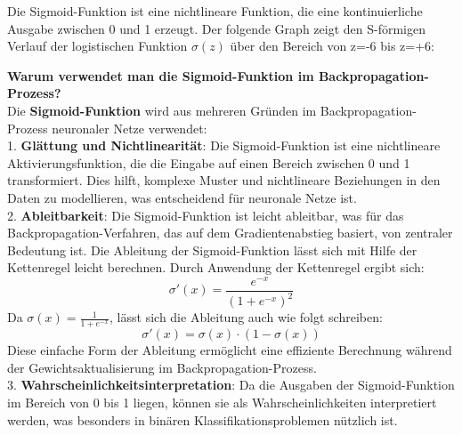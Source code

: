\documentclass[12pt]{article}
\begin{document}
Die Sigmoid-Funktion ist eine nichtlineare Funktion, die eine kontinuierliche Ausgabe zwischen 0 und 1 erzeugt. Der folgende Graph zeigt den S-förmigen Verlauf der logistischen Funktion  $\sigma(z)$ über den Bereich von z=-6 bis z=+6:\\
\begin{center}
\end{center}
%
\textbf{Warum verwendet man die Sigmoid-Funktion im Backpropagation-Prozess?}\\[0.2cm]
%
Die \textbf{Sigmoid-Funktion} wird aus mehreren Gründen im Backpropagation-Prozess neuronaler Netze verwendet:\\[0.2cm]
1. \textbf{Glättung und Nichtlinearität}: Die Sigmoid-Funktion ist eine nichtlineare Aktivierungsfunktion, die die Eingabe auf einen Bereich zwischen 0 und 1 transformiert. Dies hilft, komplexe Muster und nichtlineare Beziehungen in den Daten zu modellieren, was entscheidend für neuronale Netze ist.\\[0.2cm]
2. \textbf{Ableitbarkeit}: Die Sigmoid-Funktion ist leicht ableitbar, was für das Backpropagation-Verfahren, das auf dem Gradientenabstieg basiert, von zentraler Bedeutung ist. Die Ableitung der Sigmoid-Funktion lässt sich mit Hilfe der Kettenregel leicht berechnen. Durch Anwendung der Kettenregel ergibt sich:
\[
\sigma'(x) = \frac{e^{-x}}{(1 + e^{-x})^2}
\]
Da \(\sigma(x) = \frac{1}{1 + e^{-x}}\), lässt sich die Ableitung auch wie folgt schreiben:
\[
\sigma'(x) = \sigma(x) \cdot (1 - \sigma(x))
\]
Diese einfache Form der Ableitung ermöglicht eine effiziente Berechnung während der Gewichtsaktualisierung im Backpropagation-Prozess.\\[0.2cm]
3. \textbf{Wahrscheinlichkeitsinterpretation}: Da die Ausgaben der Sigmoid-Funktion im Bereich von 0 bis 1 liegen, können sie als Wahrscheinlichkeiten interpretiert werden, was besonders in binären Klassifikationsproblemen nützlich ist.\\[0.2cm]
\end{document}
